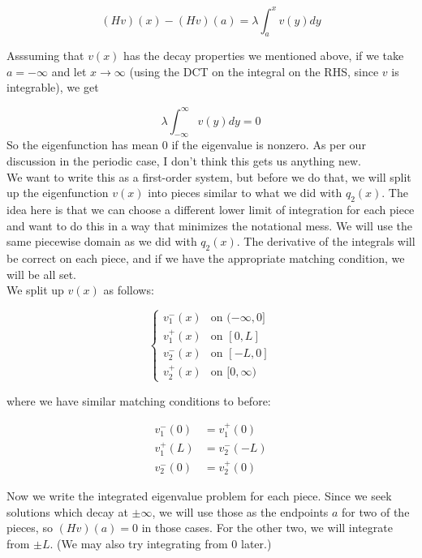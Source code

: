 \documentclass[12pt]{article}
\begin{document}
\begin{equation}\label{inteigproblem}
(Hv)(x) - (Hv)(a) = \lambda \int_{a}^x v(y) dy
\end{equation}

Asssuming that $v(x)$ has the decay properties we mentioned above, if we take $a = -\infty$ and let $x \rightarrow \infty$ (using the DCT on the integral on the RHS, since $v$ is integrable), we get

\[
\lambda \int_{-\infty}^\infty v(y) dy = 0
\]
So the eigenfunction has mean 0 if the eigenvalue is nonzero. As per our discussion in the periodic case, I don't think this gets us anything new.\\

We want to write this as a first-order system, but before we do that, we will split up the eigenfunction $v(x)$ into pieces similar to what we did with $q_2(x)$. The idea here is that we can choose a different lower limit of integration for each piece and want to do this in a way that minimizes the notational mess. We will use the same piecewise domain as we did with $q_2(x)$. The derivative of the integrals will be correct on each piece, and if we have the appropriate matching condition, we will be all set. \\

We split up $v(x)$ as follows:

\begin{equation}\label{splitv}
\begin{cases}
v_1^-(x) & \text{on } (-\infty, 0]  \\
v_1^+(x) & \text{on } [0, L]  \\
v_2^-(x) & \text{on } [-L, 0] \\
v_2^+(x) & \text{on } [0, \infty) 
\end{cases}
\end{equation}

where we have similar matching conditions to before:

\begin{align}\label{match}
v_1^-(0) &= v_1^+(0) \\
v_1^+(L) &= v_2^-(-L) \\
v_2^-(0) &= v_2^+(0)
\end{align}

Now we write the integrated eigenvalue problem for each piece. Since we seek solutions which decay at $\pm \infty$, we will use those as the endpoints $a$ for two of the pieces, so $(Hv)(a) = 0$ in those cases. For the other two, we will integrate from $\pm L$. (We may also try integrating from 0 later.)
\end{document}
